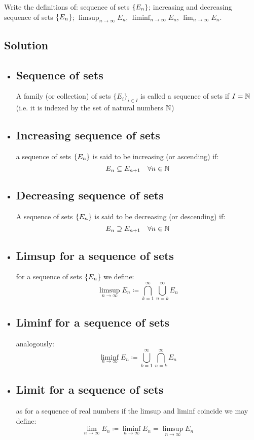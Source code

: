 \sheet


\question
Write the definitions of: sequence of sets $\{ E_n \}$; increasing and decreasing sequence of sets $\{ E_n \}$;
$\limsup_{n\to\infty} E_n$, $\liminf_{n\to\infty} E_n$, $\lim_{n\to\infty} E_n$.

\subsection*{Solution}

\provdefs
\begin{itemize}
    \item \subsection{Sequence of sets} A family (or collection) of sets $\{E_i\}_{i\in I}$ is called a sequence of sets if $I=\mathbb{N}$ (i.e. it is indexed by the set of natural numbers $\mathbb{N}$)
    \item \subsection{Increasing sequence of sets} a sequence of sets $\{ E_n \}$ is said to be increasing (or ascending) if:
    \[
        E_n \subseteq E_{n+1} \quad \forall n\in\mathbb{N}    
    \]
    \item \subsection{Decreasing sequence of sets}
    A sequence of sets $\{ E_n \}$ is said to be decreasing (or descending) if:
    \[
        E_n \supseteq E_{n+1} \quad \forall n\in\mathbb{N}    
    \]
    \item \subsection{Limsup for a sequence of sets} for a sequence of sets $\{ E_n \}$ we define:
    \[
        \limsup_{n\to\infty} E_n \coloneqq \bigcap_{k=1}^{\infty} \bigcup_{n=k}^\infty E_n
    \]
    \item \subsection{Liminf for a sequence of sets} analogously:
    \[
        \liminf_{n\to\infty} E_n \coloneqq \bigcup_{k=1}^{\infty} \bigcap_{n=k}^\infty E_n
    \]
    \item \subsection{Limit for a sequence of sets} as for a sequence of real numbers if the limsup and liminf coincide we may define:
    \[
        \lim_{n\to\infty} E_n \coloneqq \liminf_{n\to\infty} E_n = \limsup_{n\to\infty} E_n    
    \]
\end{itemize}

